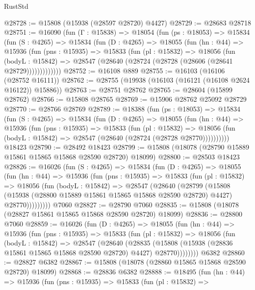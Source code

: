\begin{lexlean}{RustStd}
\begin{coremodule}
@28728 := @15808 (@15938 (@28597 @28720) @4427)
@28729 := @28683 @28718
@28751 := @16090
    (fun (Γ : @15838) =>
    @18054
      (fun (ps : @18053) =>
      @15834
        (fun (S : @4265) =>
        @15834
          (fun (D : @4265) =>
          @18055
            (fun (hn : @44) =>
            @15936
              (fun (pns : @15935) =>
              @15833
                (fun (pl : @15832) =>
                @18056
                  (fun (bodyL : @15842) =>
                  @28547 (@28640 (@28724 (@28728 (@28606 (@28641 @28729)))))))))))))
@28752 := @16108 @889
@28755 := @16103 (@16106 (@28752 @16111))
@28762 := @28755 (@19938 (@16103 (@16121 (@16108 @2624 @16122)) @15886))
@28763 := @28751 @28762
@28765 := @28604 (@15899 @28762)
@28766 := @15808 @28765
@28769 := @15906 @28762 @25092 @28729
@28770 := @28766 @28769
@28789 := @18388
    (fun (ps : @18053) =>
    @15834
      (fun (S : @4265) =>
      @15834
        (fun (D : @4265) =>
        @18055
          (fun (hn : @44) =>
          @15936
            (fun (pns : @15935) =>
            @15833
              (fun (pl : @15832) =>
              @18056 (fun (bodyL : @15842) => @28547 (@28640 (@28724 (@28728 @28770))))))))))
    @18423
@28790 := @28492 @18423
@28799 := @15808 (@18078 (@28790 @15889 @15861 @15865 @15868 @28590 @28720) @18099)
@28800 := @28503 @18423
@28826 := @16026
    (fun (S : @4265) =>
    @15834
      (fun (D : @4265) =>
      @18055
        (fun (hn : @44) =>
        @15936
          (fun (pns : @15935) =>
          @15833
            (fun (pl : @15832) =>
            @18056
              (fun (bodyL : @15842) =>
              @28547
                (@28640
                  (@28799
                    (@15808
                      (@15938 (@28800 @15889 @15861 @15865 @15868 @28590 @28720) @4427)
                      @28770)))))))))
    @7060
@28827 := @28790 @7060
@28835 := @15808 (@18078 (@28827 @15861 @15865 @15868 @28590 @28720) @18099)
@28836 := @28800 @7060
@28859 := @16026
    (fun (D : @4265) =>
    @18055
      (fun (hn : @44) =>
      @15936
        (fun (pns : @15935) =>
        @15833
          (fun (pl : @15832) =>
          @18056
            (fun (bodyL : @15842) =>
            @28547
              (@28640
                (@28835
                  (@15808 (@15938 (@28836 @15861 @15865 @15868 @28590 @28720) @4427) @28770))))))))
    @6382
@28860 := @28827 @6382
@28867 := @15808 (@18078 (@28860 @15865 @15868 @28590 @28720) @18099)
@28868 := @28836 @6382
@28888 := @18495
    (fun (hn : @44) =>
    @15936
      (fun (pns : @15935) =>
      @15833
        (fun (pl : @15832) =>

\end{coremodule}
\end{lexlean}
